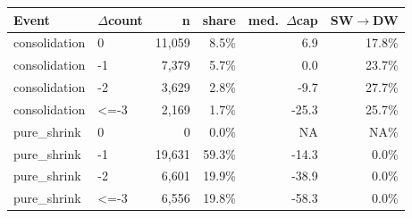 \begin{center}\small\renewcommand{\arraystretch}{1.2}
\begin{tabular}{llrrrr}
\toprule
\textbf{Event} & \textbf{$\Delta$count} & \textbf{n} & \textbf{share} & \textbf{med.\ $\Delta$cap} & \textbf{SW$\to$DW} \\
\midrule
consolidation & 0 & 11,059 & 8.5\% & 6.9 & 17.8\% \\
consolidation & -1 & 7,379 & 5.7\% & 0.0 & 23.7\% \\
consolidation & -2 & 3,629 & 2.8\% & -9.7 & 27.7\% \\
consolidation & <=-3 & 2,169 & 1.7\% & -25.3 & 25.7\% \\
pure\_shrink & 0 & 0 & 0.0\% & NA & NA\% \\
pure\_shrink & -1 & 19,631 & 59.3\% & -14.3 & 0.0\% \\
pure\_shrink & -2 & 6,601 & 19.9\% & -38.9 & 0.0\% \\
pure\_shrink & <=-3 & 6,556 & 19.8\% & -58.3 & 0.0\% \\
\bottomrule
\end{tabular}
\end{center}
\vspace{0.1cm}{\centering\scriptsize Portfolio-change facility-years that keep operating. Consolidation $=$ any install in the year; pure-shrink $=$ none. Shares within event type; med.\ $\Delta$cap in \%. Includes net-0 swaps.\par}
